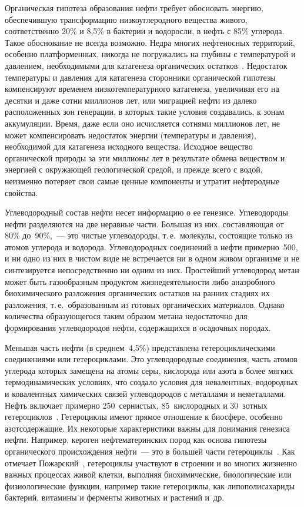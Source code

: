 \begin{multicols}{2}
     Органическая гипотеза образования нефти требует обосновать энергию, 
обеспечившую трансформацию низкоуглеродного вещества живого, 
соответственно 20\% и 8,5\% в бактерии и водоросли, в нефть с 85\% углерода. 
Такое обоснование не всегда возможно. Недра многих нефтеносных территорий, 
особенно платформенных, никогда не погружались на глубины с температурой и 
давлением, необходимыми для катагенеза органических остатков~\cite{19s}. 
Недостаток температуры и давления для катагенеза сторонники органической 
гипотезы компенсируют временем низкотемпературного катагенеза, увеличивая 
его на десятки и даже сотни миллионов лет, или миграцией нефти из далеко 
расположенных зон генерации, в которых такие условия создавались, к зонам 
аккумуляции. Время, даже если оно ис\-чис\-ля\-ет\-ся сотнями миллионов лет, не может 
компенсировать недостаток энергии (температуры и давления), необходимой для 
катагенеза исходного вещества. Исходное вещество органической природы за эти 
миллионы лет в результате обмена веществом и энергией с окружающей геологической 
средой, и прежде всего с водой, неизменно потеряет свои самые ценные 
компоненты и утратит нефтеродные свойства. 
     
     Углеводородный состав нефти несет информацию о ее генезисе. 
Углеводороды нефти разделяются на две неравные части. Большая из них, 
составляющая от 80\% до~90\%,~--- это чистые углеводороды, т.\,е.\ молекулы, 
состоящие только из атомов углерода и водорода. Углеводородных соединений в 
нефти примерно~500, и ни одно из них в чистом виде не встречается ни в одном 
живом организме и не синтезируется непосредственно ни одним из них. 
Простейший углеводород метан может быть газообразным продуктом 
жизнедеятельности либо анаэробного биохимического разложения органических 
остатков на ранних стадиях их разложения, т.\,е.\ образованным из готовых 
органических материалов. Однако количества образующегося таким образом 
метана недостаточно для формирования углеводородов нефти, содержащихся в 
осадочных породах.
     
     Меньшая часть нефти (в среднем~4,5\%) пред\-став\-ле\-на гетероциклическими 
соединениями или гетероциклами. Это углеводородные соединения, часть атомов 
углерода которых замещена на атомы серы, кислорода или азота в более мягких 
термодинамических условиях, что создало условия для невалентных, водородных и 
ковалентных химических связей углеводородов с металлами и неметаллами. Нефть 
включает примерно 250~сернистых, 85~кис\-ло\-род\-ных и 30~зотных 
гетероциклов~\cite{16s}. Ге\-те\-ро\-цик\-лы имеют прямое отношение к биосфере, 
особенно азотсодержащие. Их некоторые характеристики важны для понимания 
генезиса нефти. Например, кероген нефтематеринских пород как основа гипотезы 
органического происхождения нефти~--- это в большей части 
гетероциклы~\cite{34s, 4s}. Как отмечает Пожарский~\cite{18s}, 
гетероциклы участвуют в строении и во многих жизненно важных процессах 
живой клетки, выполняя биохимические, биологические или физиологические 
функции, например такие гетероциклы, как липополисахариды бактерий, витамины 
и ферменты животных и рас\-те\-ний и~др. 
     

\end{multicols}
